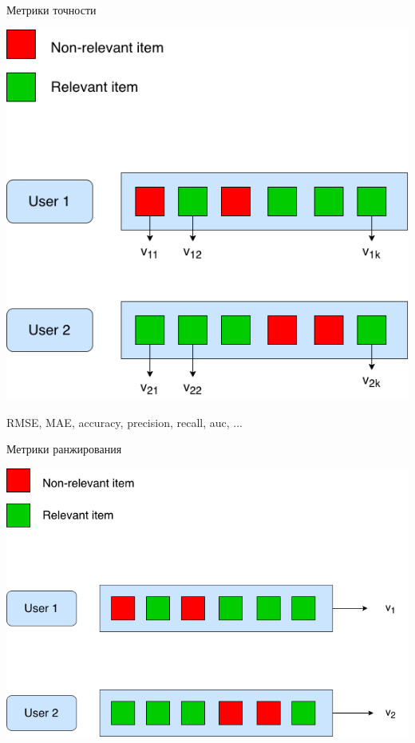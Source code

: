 \documentclass[11pt,aspectratio=169,handout]{beamer}
\begin{document}
\begin{frame}{Метрики точности}

\begin{center}
\includegraphics[scale=0.3]{images/pointwise-metrics.png}
\end{center}
RMSE, MAE, accuracy, precision, recall, auc, ...

\end{frame}

\begin{frame}{Метрики ранжирования}

\begin{center}
\includegraphics[scale=0.3]{images/ranking-metrics.png}
\end{center}

\end{frame}
\end{document}
